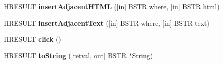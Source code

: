 \begin{DoxyCompactItemize}
H\+R\+E\+S\+U\+LT {\bfseries insert\+Adjacent\+H\+T\+ML} (\mbox{[}in\mbox{]} B\+S\+TR where, \mbox{[}in\mbox{]} B\+S\+TR html)
\item 
\mbox{\label{interface_m_s_h_t_m_l_1_1_i_h_t_m_l_element_adf42069052f889a53582af0d2d6be39d}} 
H\+R\+E\+S\+U\+LT {\bfseries insert\+Adjacent\+Text} (\mbox{[}in\mbox{]} B\+S\+TR where, \mbox{[}in\mbox{]} B\+S\+TR text)
\item 
\mbox{\label{interface_m_s_h_t_m_l_1_1_i_h_t_m_l_element_a6d45ac88c4565668d0e199ec5991f1f4}} 
H\+R\+E\+S\+U\+LT {\bfseries click} ()
\item 
\mbox{\label{interface_m_s_h_t_m_l_1_1_i_h_t_m_l_element_aea61dc04497206ce7b43a978ec6025ef}} 
H\+R\+E\+S\+U\+LT {\bfseries to\+String} (\mbox{[}retval, out\mbox{]} B\+S\+TR $\ast$String)
\end{DoxyCompactItemize}
